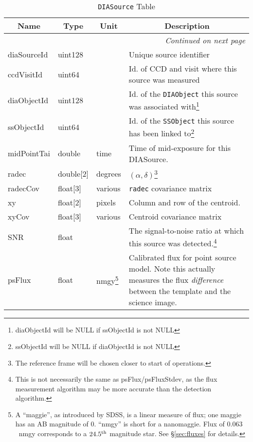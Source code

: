 \documentclass[12pt]{article}
\newcommand{\code}[1]{\texttt{#1}}
\newcommand{\DIASource}{\code{DIASource}\xspace}
\newcommand{\DIAObject}{\code{DIAObject}\xspace}
\newcommand{\SSObject}{\code{SSObject}\xspace}
\begin{document}
\begin{center}
\begin{longtable}{p{3cm}p{2cm}p{2cm}p{5cm}}
\caption[\DIASource Table]{\DIASource Table
} \\

\hline \multicolumn{1}{c}{\bf Name} & \multicolumn{1}{c}{\bf Type} & \multicolumn{1}{c}{\bf Unit} & \multicolumn{1}{c}{\bf Description} \\ \hline
\endhead

\hline \multicolumn{4}{r}{{\em Continued on next page}} \\
\endfoot

\hline\hline
\endlastfoot

diaSourceId & uint128 & ~ & Unique source identifier \\ 

ccdVisitId & uint64 & ~ & Id. of CCD and visit where this source was measured \\ 

diaObjectId & uint128 & ~ & Id. of the \DIAObject this source was associated with\footnote{diaObjectId will be NULL if ssObjectId is not NULL} \\ 

ssObjectId & uint64 & ~ & Id. of the \SSObject this source has been linked to\footnote{ssObjectId will be NULL if diaObjectId is not NULL} \\ 

midPointTai & double & time & Time of mid-exposure for this DIASource. \\ 

radec & double[2] & degrees & $(\alpha, \delta)$\footnote{The reference frame will be chosen closer to start of operations.} \\ 

radecCov & float[3] & various & \texttt{radec} covariance matrix \\ 

xy & float[2] & pixels & Column and row of the centroid. \\ 

xyCov & float[3] & various & Centroid covariance matrix \\ 

SNR & float & ~ & The signal-to-noise ratio at which this source was detected.\footnote{This is not necessarily the same as psFlux/psFluxStdev, as the flux measurement algorithm may be more accurate than the detection algorithm.} \\

psFlux & float & nmgy\footnote{A ``maggie'', as introduced by SDSS, is a linear measure of flux; one maggie has an AB magnitude of 0. ``nmgy'' is short for a nanomaggie. Flux of $0.063$~nmgy corresponds to a $24.5^{\rm th}$ magnitude star. See \S \ref{sec:fluxes} for details.} & Calibrated flux for point source model. Note this actually measures the flux {\em difference} between the template and the science image. \\ 


\end{longtable}
\end{center}
\end{document}
